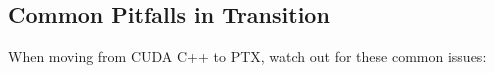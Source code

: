 \subsection{Common Pitfalls in Transition}

When moving from CUDA C++ to PTX, watch out for these common issues:

